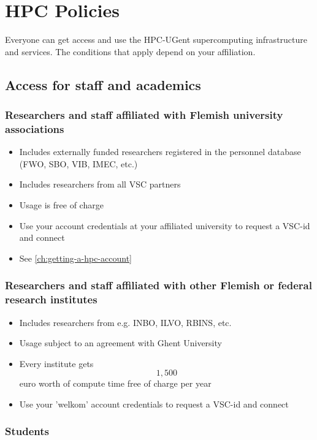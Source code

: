 \chapter{HPC Policies}
\label{ch:hpc-policies}

Everyone can get access and use the HPC-UGent supercomputing infrastructure and services.
The conditions that apply depend on your affiliation.

\section{Access for staff and academics}

\subsection{Researchers and staff affiliated with Flemish university associations}

\begin{itemize}
  \item Includes externally funded researchers registered in the personnel database (FWO, SBO, VIB, IMEC, etc.)
  \item Includes researchers from all VSC partners
  \item Usage is free of charge
  \item Use your account credentials at your affiliated university to request a VSC-id and connect
  \item See \autoref{ch:getting-a-hpc-account}
\end{itemize}


\subsection{Researchers and staff affiliated with other Flemish or federal research institutes}

\begin{itemize}
  \item Includes researchers from e.g. INBO, ILVO, RBINS, etc.
  \item Usage subject to an agreement with Ghent University
  \item Every institute gets $$1,500$$ euro worth of compute time free of charge per year
  \item Use your 'welkom' account credentials to request a VSC-id and connect
\end{itemize}


\subsection{Students}

